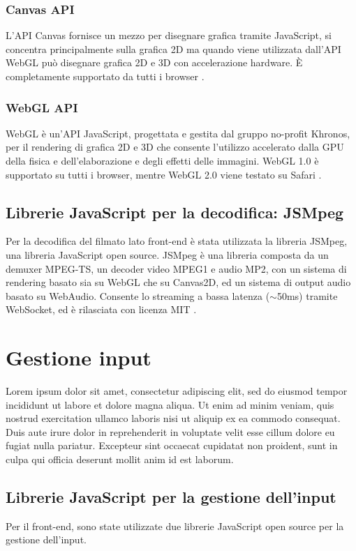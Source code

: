 \subsubsection{Canvas API}
L'API Canvas fornisce un mezzo per disegnare grafica tramite JavaScript, si concentra principalmente sulla grafica 2D ma quando viene utilizzata dall'API WebGL può disegnare grafica 2D e 3D con accelerazione hardware. È completamente supportato da tutti i browser \parencite{Canvas_API}.

\subsubsection{WebGL API}
WebGL è un'API JavaScript, progettata e gestita dal gruppo no-profit Khronos, per il rendering di grafica 2D e 3D che consente l'utilizzo accelerato dalla GPU della fisica e dell'elaborazione e degli effetti delle immagini. WebGL 1.0 è supportato su tutti i browser, mentre WebGL 2.0 viene testato su Safari \parencite{WebGL}.

\subsection{Librerie JavaScript per la decodifica: JSMpeg}
Per la decodifica del filmato lato front-end è stata utilizzata la libreria JSMpeg, una libreria JavaScript open source. JSMpeg è una libreria composta da un demuxer MPEG-TS, un decoder video MPEG1 e audio MP2, con un sistema di rendering basato sia su WebGL che su Canvas2D, ed un sistema di output audio basato su WebAudio. Consente lo streaming a bassa latenza ($\sim$50ms) tramite WebSocket, ed è rilasciata con licenza MIT \parencite{JSMpeg}.




\section{Gestione input}
Lorem ipsum dolor sit amet, consectetur adipiscing elit, sed do eiusmod tempor incididunt ut labore et dolore magna aliqua. Ut enim ad minim veniam, quis nostrud exercitation ullamco laboris nisi ut aliquip ex ea commodo consequat. Duis aute irure dolor in reprehenderit in voluptate velit esse cillum dolore eu fugiat nulla pariatur. Excepteur sint occaecat cupidatat non proident, sunt in culpa qui officia deserunt mollit anim id est laborum.

\subsection{Librerie JavaScript per la gestione dell'input}
Per il front-end, sono state utilizzate due librerie JavaScript open source per la gestione dell'input.

